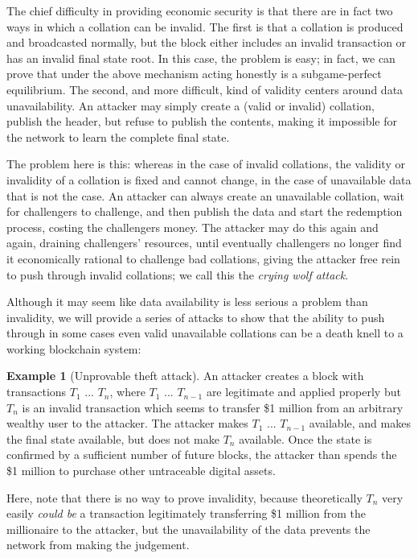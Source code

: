 \documentclass[11pt,a4paper]{article}
\theoremstyle{plain}
\theoremstyle{definition}
\newtheorem{exmp}{Example}[section]
\theoremstyle{remark}
\begin{document}
The chief difficulty in providing economic security is that there are in fact two ways in which a collation can be invalid. The first is that a collation is produced and broadcasted normally, but the block either includes an invalid transaction or has an invalid final state root. In this case, the problem is easy; in fact, we can prove that under the above mechanism acting honestly is a subgame-perfect equilibrium. The second, and more difficult, kind of validity centers around data unavailability. An attacker may simply create a (valid or invalid) collation, publish the header, but refuse to publish the contents, making it impossible for the network to learn the complete final state.

The problem here is this: whereas in the case of invalid collations, the validity or invalidity of a collation is fixed and cannot change, in the case of unavailable data that is not the case. An attacker can always create an unavailable collation, wait for challengers to challenge, and then publish the data and start the redemption process, costing the challengers money. The attacker may do this again and again, draining challengers' resources, until eventually challengers no longer find it economically rational to challenge bad collations, giving the attacker free rein to push through invalid collations; we call this the \emph{crying wolf attack}.

Although it may seem like data availability is less serious a problem than invalidity, we will provide a series of attacks to show that the ability to push through in some cases even valid unavailable collations can be a death knell to a working blockchain system:

\begin{exmp}[Unprovable theft attack]
An attacker creates a block with transactions $T_1$ ... $T_n$, where $T_1$ ... $T_{n-1}$ are legitimate and applied properly but $T_n$ is an invalid transaction which seems to transfer \$1 million from an arbitrary wealthy user to the attacker. The attacker makes $T_1$ ... $T_{n-1}$ available, and makes the final state available, but does not make $T_n$ available. Once the state is confirmed by a sufficient number of future blocks, the attacker than spends the \$1 million to purchase other untraceable digital assets.

Here, note that there is no way to prove invalidity, because theoretically $T_n$ very easily \emph{could be} a transaction legitimately transferring \$1 million from the millionaire to the attacker, but the unavailability of the data prevents the network from making the judgement.
\end{exmp}
\end{document}
